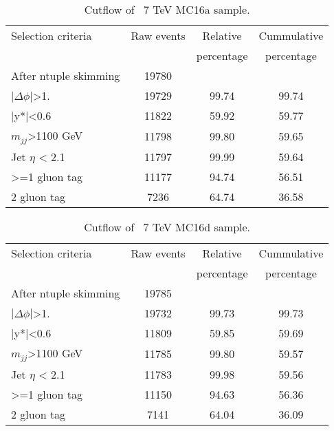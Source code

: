 \begin{table}[ht]
\begin{center}
\begin{tabular}{|l|c|c|c|}
\hline
Selection criteria & Raw events &  Relative & Cummulative \\
 & & percentage & percentage \\
\hline
After ntuple skimming & 19780 &  &  \\
$|\Delta\phi|$>1. & 19729 & 99.74 & 99.74 \\
|y*|<0.6 & 11822 & 59.92 & 59.77 \\
$m_{jj}$>1100 GeV & 11798 & 99.80 & 59.65 \\
Jet $\eta$ < 2.1 & 11797 & 99.99 & 59.64 \\
>=1 gluon tag & 11177 & 94.74 & 56.51 \\
2 gluon tag & 7236 & 64.74 & 36.58 \\
\hline
\end{tabular}
\end{center}
\caption{Cutflow of \Hprime\ 7 TeV MC16a sample.}
\end{table}

\begin{table}[ht]
\begin{center}
\begin{tabular}{|l|c|c|c|}
\hline
Selection criteria & Raw events &  Relative & Cummulative \\
 & & percentage & percentage \\
\hline
After ntuple skimming & 19785 &  &  \\
$|\Delta\phi|$>1. & 19732 & 99.73 & 99.73 \\
|y*|<0.6 & 11809 & 59.85 & 59.69 \\
$m_{jj}$>1100 GeV & 11785 & 99.80 & 59.57 \\
Jet $\eta$ < 2.1 & 11783 & 99.98 & 59.56 \\
>=1 gluon tag & 11150 & 94.63 & 56.36 \\
2 gluon tag & 7141 & 64.04 & 36.09 \\
\hline
\end{tabular}
\end{center}
\caption{Cutflow of \Hprime\ 7 TeV MC16d sample.}
\end{table}

